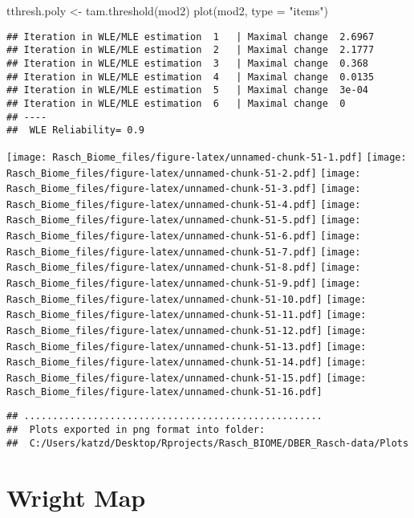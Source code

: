 \documentclass[
]{book}
\newenvironment{Shaded}{\begin{snugshade}}{\end{snugshade}}
\newcommand{\AttributeTok}[1]{\textcolor[rgb]{0.77,0.63,0.00}{#1}}
\newcommand{\FunctionTok}[1]{\textcolor[rgb]{0.00,0.00,0.00}{#1}}
\newcommand{\NormalTok}[1]{#1}
\newcommand{\OtherTok}[1]{\textcolor[rgb]{0.56,0.35,0.01}{#1}}
\newcommand{\StringTok}[1]{\textcolor[rgb]{0.31,0.60,0.02}{#1}}
\begin{document}
\begin{Shaded}
\begin{Highlighting}[]
\NormalTok{tthresh.poly }\OtherTok{\textless{}{-}} \FunctionTok{tam.threshold}\NormalTok{(mod2)}
\FunctionTok{plot}\NormalTok{(mod2, }\AttributeTok{type =} \StringTok{"items"}\NormalTok{)}
\end{Highlighting}
\end{Shaded}

\begin{verbatim}
## Iteration in WLE/MLE estimation  1   | Maximal change  2.6967 
## Iteration in WLE/MLE estimation  2   | Maximal change  2.1777 
## Iteration in WLE/MLE estimation  3   | Maximal change  0.368 
## Iteration in WLE/MLE estimation  4   | Maximal change  0.0135 
## Iteration in WLE/MLE estimation  5   | Maximal change  3e-04 
## Iteration in WLE/MLE estimation  6   | Maximal change  0 
## ----
##  WLE Reliability= 0.9
\end{verbatim}

\texttt{[image: Rasch\_Biome\_files/figure-latex/unnamed-chunk-51-1.pdf]} \texttt{[image: Rasch\_Biome\_files/figure-latex/unnamed-chunk-51-2.pdf]} \texttt{[image: Rasch\_Biome\_files/figure-latex/unnamed-chunk-51-3.pdf]} \texttt{[image: Rasch\_Biome\_files/figure-latex/unnamed-chunk-51-4.pdf]} \texttt{[image: Rasch\_Biome\_files/figure-latex/unnamed-chunk-51-5.pdf]} \texttt{[image: Rasch\_Biome\_files/figure-latex/unnamed-chunk-51-6.pdf]} \texttt{[image: Rasch\_Biome\_files/figure-latex/unnamed-chunk-51-7.pdf]} \texttt{[image: Rasch\_Biome\_files/figure-latex/unnamed-chunk-51-8.pdf]} \texttt{[image: Rasch\_Biome\_files/figure-latex/unnamed-chunk-51-9.pdf]} \texttt{[image: Rasch\_Biome\_files/figure-latex/unnamed-chunk-51-10.pdf]} \texttt{[image: Rasch\_Biome\_files/figure-latex/unnamed-chunk-51-11.pdf]} \texttt{[image: Rasch\_Biome\_files/figure-latex/unnamed-chunk-51-12.pdf]} \texttt{[image: Rasch\_Biome\_files/figure-latex/unnamed-chunk-51-13.pdf]} \texttt{[image: Rasch\_Biome\_files/figure-latex/unnamed-chunk-51-14.pdf]} \texttt{[image: Rasch\_Biome\_files/figure-latex/unnamed-chunk-51-15.pdf]} \texttt{[image: Rasch\_Biome\_files/figure-latex/unnamed-chunk-51-16.pdf]}

\begin{verbatim}
## ....................................................
##  Plots exported in png format into folder:
##  C:/Users/katzd/Desktop/Rprojects/Rasch_BIOME/DBER_Rasch-data/Plots
\end{verbatim}

\hypertarget{wright-map-1}{%
\section{Wright Map}\label{wright-map-1}}
\end{document}
